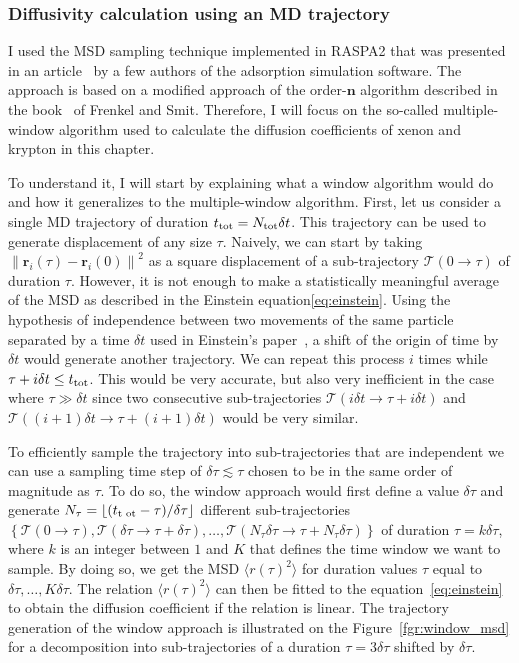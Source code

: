 \documentclass[main]{subfiles}
\begin{document}
\subsubsection{Diffusivity calculation using an MD trajectory}

I used the MSD sampling technique implemented in RASPA2\autocite{dubbeldam2016} that was presented in an article~\cite{Dubbeldam_2009} by a few authors of the adsorption simulation software. The approach is based on a modified approach of the order-$\mathbf{n}$ algorithm described in the book~\cite{frenkel2001msd} of Frenkel and Smit. Therefore, I will focus on the so-called multiple-window algorithm used to calculate the diffusion coefficients of xenon and krypton in this chapter. 

To understand it, I will start by explaining what a window algorithm would do and how it generalizes to the multiple-window algorithm.
First, let us consider a single MD trajectory of duration $t_{\text{tot}}=N_{\text{tot}}\delta t$. This trajectory can be used to generate displacement of any size $\tau$. Naively, we can start by taking ${\lVert\mathbf{r}_i(\tau)-\mathbf{r}_i(0)\rVert}^2$ as a square displacement of a sub-trajectory $\mathcal{T}(0\rightarrow\tau)$ of duration $\tau$. 
However, it is not enough to make a statistically meaningful average of the MSD as described in the Einstein equation\ref{eq:einstein}. Using the hypothesis of independence between two movements of the same particle separated by a time $\delta t$ used in Einstein's paper~\cite{einstein1905motion}, a shift of the origin of time by $\delta t$ would generate another trajectory. We can repeat this process $i$ times while $\tau + i\delta t\leq t_{\text{tot}}$. This would be very accurate, but also very inefficient in the case where $\tau \gg \delta t$ since two consecutive sub-trajectories $\mathcal{T}(i\delta t\rightarrow\tau+i\delta t)$ and $\mathcal{T}((i+1)\delta t\rightarrow\tau+(i+1)\delta t)$ would be very similar. 

To efficiently sample the trajectory into sub-trajectories that are independent we can use a sampling time step of $\delta \tau\lesssim\tau$ chosen to be in the same order of magnitude as $\tau$. To do so, the window approach would first define a value $\delta \tau$ and generate $N_{\tau} = \lfloor(t_{\text{t ot}} -\tau)/ \delta\tau \rfloor$ different sub-trajectories $\left\{\mathcal{T}(0\rightarrow\tau), \mathcal{T}(\delta\tau\rightarrow\tau + \delta\tau), \ldots, \mathcal{T}(N_{\tau}\delta\tau\rightarrow\tau + N_{\tau}\delta\tau)\right\}$ of duration $\tau=k\delta\tau$, where $k$ is an integer between $1$ and $K$ that defines the time window we want to sample. By doing so, we get the MSD $\langle {r(\tau)}^2 \rangle$ for duration values $\tau$ equal to $\delta\tau, \ldots, K\delta\tau$. The relation $\langle {r(\tau)}^2 \rangle$ can then be fitted to the equation~\ref{eq:einstein} to obtain the diffusion coefficient if the relation is linear. The trajectory generation of the window approach is illustrated on the Figure~\ref{fgr:window_msd} for a decomposition into sub-trajectories of a duration $\tau=3\delta\tau$ shifted by $\delta\tau$.
\end{document}
